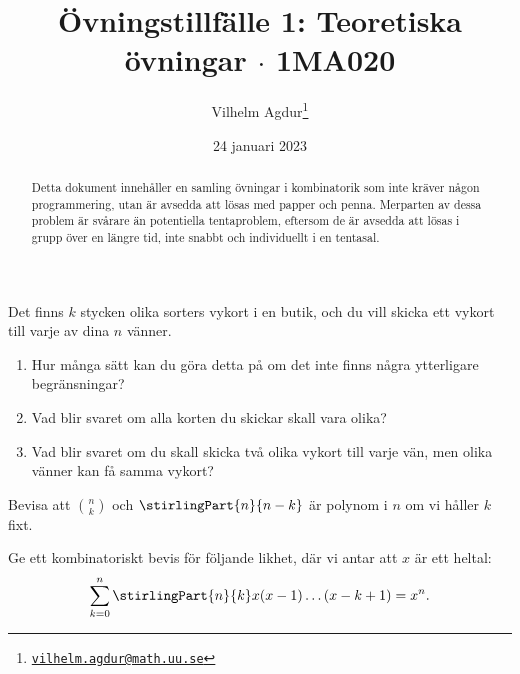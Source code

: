 \documentclass[nobib]{tufte-handout}
\title{Övningstillfälle 1: Teoretiska övningar $\cdot$ 1MA020}
\author[Vilhelm Agdur]{Vilhelm Agdur\thanks{\href{mailto:vilhelm.agdur@math.uu.se}{\nolinkurl{vilhelm.agdur@math.uu.se}}}}
\date{24 januari 2023}
\begin{document}
\maketitle%

\begin{abstract}
\noindent
Detta dokument innehåller en samling övningar i kombinatorik som inte kräver någon programmering, utan är avsedda att lösas med papper och penna. Merparten av dessa problem är svårare än potentiella tentaproblem, eftersom de är avsedda att lösas i grupp över en längre tid, inte snabbt och individuellt i en tentasal.
\end{abstract}

\begin{xca}
    Det finns $k$ stycken olika sorters vykort i en butik, och du vill skicka ett vykort till varje av dina $n$ vänner.

    \begin{enumerate}
        \item Hur många sätt kan du göra detta på om det inte finns några ytterligare begränsningar?
        \item Vad blir svaret om alla korten du skickar skall vara olika?
        \item Vad blir svaret om du skall skicka två olika vykort till varje vän, men olika vänner kan få samma vykort?
    \end{enumerate}
\end{xca}

\begin{xca}
    Bevisa att $\binom{n}{k}$ och $\stirlingPart{n}{n-k}$ är polynom i $n$ om vi håller $k$ fixt.
\end{xca}

\begin{xca}
    Ge ett kombinatoriskt bevis för följande likhet, där vi antar att $x$ är ett heltal:
    $$\sum_{k = 0}^{n} \stirlingPart{n}{k}x(x-1)\ldots(x-k+1) = x^n.$$
\end{xca}
\end{document}
